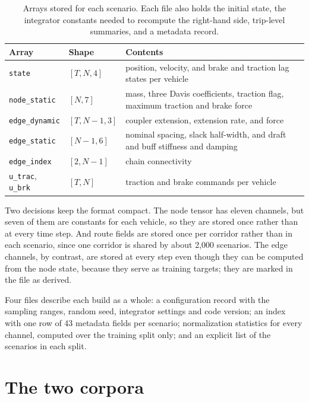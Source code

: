 \begin{table}[htbp]
    \centering
    \begin{tabular}{llp{7.2cm}}
        \toprule
        Array & Shape & Contents \\
        \midrule
        \texttt{state}        & $[T, N, 4]$   & position, velocity, and brake and traction lag states per vehicle \\
        \texttt{node\_static} & $[N, 7]$      & mass, three Davis coefficients, traction flag, maximum traction and brake force \\
        \texttt{edge\_dynamic} & $[T, N{-}1, 3]$ & coupler extension, extension rate, and force \\
        \texttt{edge\_static} & $[N{-}1, 6]$  & nominal spacing, slack half-width, and draft and buff stiffness and damping \\
        \texttt{edge\_index}  & $[2, N{-}1]$  & chain connectivity \\
        \texttt{u\_trac}, \texttt{u\_brk} & $[T, N]$ & traction and brake commands per vehicle \\
        \bottomrule
    \end{tabular}
    \caption{Arrays stored for each scenario. Each file also holds the initial state, the integrator constants needed to recompute the right-hand side, trip-level summaries, and a metadata record.}
    \label{tab:dataset_contents}
\end{table}

Two decisions keep the format compact. The node tensor has eleven channels, but seven of them are constants for each vehicle, so they are stored once rather than at every time step. And route fields are stored once per corridor rather than in each scenario, since one corridor is shared by about 2,000 scenarios. The edge channels, by contrast, are stored at every step even though they can be computed from the node state, because they serve as training targets; they are marked in the file as derived.

Four files describe each build as a whole: a configuration record with the sampling ranges, random seed, integrator settings and code version; an index with one row of 43 metadata fields per scenario; normalization statistics for every channel, computed over the training split only; and an explicit list of the scenarios in each split.

\section{The two corpora}
\label{sec:dataset_corpora}

